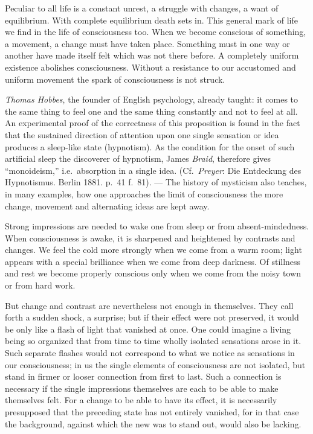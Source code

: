 \documentclass[12pt,a4paper]{book}
\newcommand{\opage}[1]{\marginnote{\footnotesize\textit{[#1]}}}
\begin{document}
Peculiar to all life is a constant unrest, a struggle with changes, a
want of equilibrium. With complete equilibrium death sets in. This
general mark of life we find in the life of consciousness too. When we
become conscious of something, a movement, a change must have taken
place. Something must in one way or another have made itself felt which
was not there before. A completely uniform existence abolishes
consciousness. Without a resistance to our accustomed and uniform
movement the spark of consciousness is not struck.

\emph{Thomas Hobbes}, the founder of English psychology, already taught:
it comes to the same thing to feel one and the same thing constantly
and not to feel at all. An experimental proof of the correctness of this
proposition is found in the fact that the sustained direction of
attention upon one single sensation or idea produces a sleep-like state
(hypnotism). As the condition for the onset of such artificial sleep the
discoverer of hypnotism, James \emph{Braid}, therefore gives
``monoideism,'' i.e.\ absorption in a single idea. (Cf.\ \emph{Preyer}:
Die Entdeckung des Hypnotismus. Berlin 1881. p.~41 f.\ 81). --- The
history of mysticism also teaches, in many examples, how one approaches
the limit of consciousness the more change, movement and alternating
ideas are kept away.

Strong impressions are needed to wake one from sleep or from
absent-mindedness. When consciousness is awake, it is sharpened and
heightened by contrasts and changes. We feel the cold more strongly when
we come from a warm room; light appears with a special brilliance when
we come from deep darkness. Of stillness and rest we become properly
conscious only when we come from the noisy town or from hard work.


\opage{56}But change and contrast are nevertheless not enough in
themselves. They call forth a sudden shock, a surprise; but if their
effect were not preserved, it would be only like a flash of light that
vanished at once. One could imagine a living being so organized that
from time to time wholly isolated sensations arose in it. Such separate
flashes would not correspond to what we notice as sensations in our
consciousness; in us the single elements of consciousness are not
isolated, but stand in firmer or looser connection from first to last.
Such a connection is necessary if the single impressions themselves are
each to be able to make themselves felt. For a change to be able to have
its effect, it is necessarily presupposed that the preceding state has
not entirely vanished, for in that case the background, against which
the new was to stand out, would also be lacking.
\end{document}

